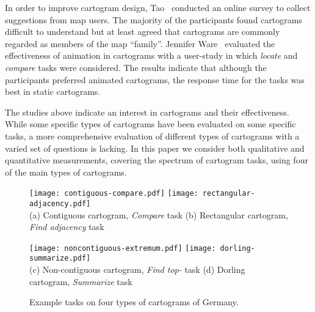 \documentclass[10pt,journal,compsoc]{IEEEtran}
\begin{document}
In order to improve cartogram design, Tao~\cite{Manting} conducted an online survey to collect suggestions from map users. 
The majority of the participants found cartograms difficult to understand 
but at least agreed that 
 cartograms are commonly regarded as members of the map ``family''. 
  Jennifer Ware~\cite{Jen} evaluated the effectiveness of animation in cartograms with a user-study in which \textit{locate} and \textit{compare} tasks were considered. The results indicate that although the participants preferred animated cartograms, the response time for the tasks was best in static cartograms. 

The studies above indicate an interest in cartograms and their effectiveness. While some specific types of cartograms have been evaluated on some specific tasks, a more comprehensive evaluation of different types of cartograms with a varied set of questions is lacking. In this paper we consider both qualitative and quantitative measurements, covering the spectrum of cartogram tasks, using four of the main types of cartograms.



\begin{figure*}[t!]
\centering
\hfill
\texttt{[image: contiguous-compare.pdf]}
\hfill
\texttt{[image: rectangular-adjacency.pdf]}
\hfill
\\

(a) Contiguous cartogram, \textit{Compare} task \hspace{0.2\textwidth}(b) Rectangular cartogram, \textit{Find adjacency} task\\

\medskip

\hfill
\texttt{[image: noncontiguous-extremum.pdf]}
\hfill
\texttt{[image: dorling-summarize.pdf]}
\hfill
\\

\hspace{-0.08\textwidth}
(c) Non-contiguous cartogram, \textit{Find top-} task \hspace{0.15\textwidth}(d) Dorling cartogram, \textit{Summarize} task\\

\caption{Example tasks on four types of cartograms of Germany.}

\label{fig:four-types}
\end{figure*}
\end{document}
